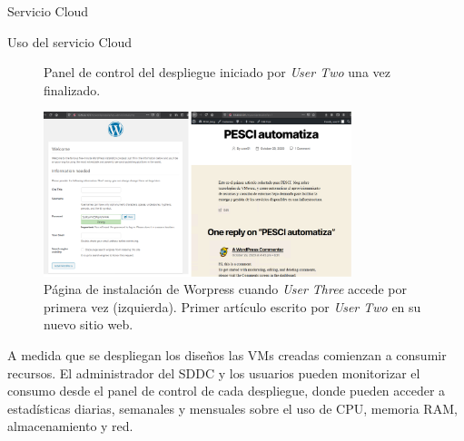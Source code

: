\begin{subsection}{Servicio Cloud}
\begin{subsubsection}{Uso del servicio Cloud}
\begin{figure}[h]
            \caption{Panel de control del despliegue iniciado por \textit{User Two} una vez finalizado.}
            \label{fig:control-panel-user2}
        \end{figure}
        \FloatBarrier
        \begin{figure}[h]
            \centering
            \includegraphics[width=0.8\textwidth]{imaxes/pruebaconcepto/vrealize/wordpress-installation.png}
            \caption{Página de instalación de Worpress cuando \textit{User Three} accede por primera vez (izquierda). Primer artículo escrito por \textit{User Two} en su nuevo sitio web.}
            \label{fig:wordpress-user-2}
        \end{figure}
        \FloatBarrier
        A medida que se despliegan los diseños las VMs creadas comienzan a consumir recursos. El administrador del SDDC y los usuarios pueden monitorizar el consumo desde el panel de control de cada despliegue, donde pueden acceder a estadísticas diarias, semanales y mensuales sobre el uso de CPU, memoria RAM, almacenamiento y red.
        \begin{figure}[h]

\end{figure}
\end{subsubsection}
\end{subsection}
